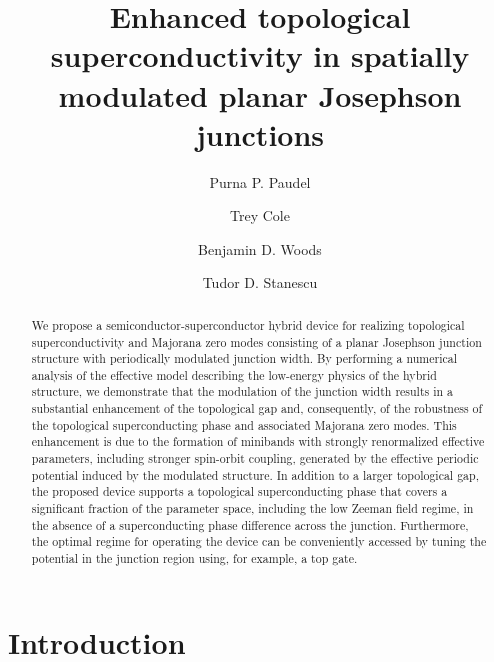 \documentclass[twocolumn,aps,prb,nofootinbib]{revtex4-2}
\begin{document}
\title{Enhanced topological superconductivity in spatially modulated planar Josephson junctions}
\author{Purna P. Paudel}
\author{Trey Cole}
\author{Benjamin D. Woods}
\author{Tudor D. Stanescu}

\begin{abstract}
We propose a semiconductor-superconductor hybrid device for realizing topological superconductivity and Majorana zero modes  consisting of a planar Josephson junction structure with periodically modulated junction width. By performing a numerical analysis of the effective model describing the low-energy physics of the hybrid structure, we demonstrate that the modulation of the junction width results in a substantial enhancement of the topological gap and, consequently, of the robustness of the topological superconducting phase and associated Majorana zero modes. This enhancement is due to the formation of minibands with strongly renormalized effective parameters, including stronger spin-orbit coupling, generated by the effective periodic potential induced by the modulated structure. In addition to a larger topological gap, the proposed device supports a topological superconducting phase that covers a significant fraction of the parameter space, including the low Zeeman field regime, in the absence of a superconducting phase difference across the junction. Furthermore, the optimal regime for operating the device can be conveniently accessed by tuning the potential in the junction region using, for example, a top gate. 
\end{abstract}

\maketitle

\section{Introduction}
\end{document}
